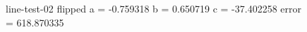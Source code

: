 \begin{figure}
	\centering
	\begin{minipage}[t]{0.32\linewidth}
		\centering
		\caption{line-test-02 flipped \break a = -0.759318 \break b = 0.650719 \break c = -37.402258 \break error = 618.870335}
		\label{fig:4_2_flipped}
	\end{minipage}
	\hfill
	\begin{minipage}[t]{0.32\linewidth}
		\centering

\end{minipage}
\end{figure}

